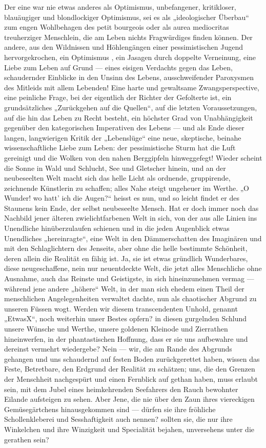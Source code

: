 Der eine war nie etwas anderes als Optimismus, unbefangener, kritikloser, blauäugiger und blondlockiger Optimismus, sei es als „ideologischer Überbau“ zum engen Wohlbehagen des petit bourgeois oder als aurea mediocritas treuherziger Menschlein, die am Leben nichts Fragwürdiges finden können. Der andere, aus den Wildnissen und Höhlengängen einer pessimistischen Jugend hervorgekrochen, ein Optimismus , ein Jasagen durch doppelte Verneinung, eine Liebe zum Leben auf Grund — eines eisigen Verdachts gegen das Leben, schaudernder Einblicke in den Unsinn des Lebens, ausschweifender Paroxysmen des Mitleids mit allem Lebenden! Eine harte und gewaltsame Zwangsperspective, eine peinliche Frage, bei der eigentlich der Richter der Gefolterte ist, ein grundsätzliches „Zurückgehen auf die Quellen“, auf die letzten Voraussetzungen, auf die hin das Leben zu Recht besteht, ein höchster Grad von Unabhängigkeit gegenüber den kategorischen Imperativen des Lebens — und als Ende dieser langen, langwierigen Kritik der „Lebenslüge“ eine neue, skeptische, beinahe wissenschaftliche Liebe zum Leben: der pessimistische Sturm hat die Luft gereinigt und die Wolken von den nahen Berggipfeln hinweggefegt! Wieder scheint die Sonne in Wald und Schlucht, See und Gletscher hinein, und an der neubeseelten Welt macht sich das helle Licht als ordnende, gruppirende, zeichnende Künstlerin zu schaffen; alles Nahe steigt ungeheuer im Werthe. „O Wunder! wo hatt’ ich die Augen?“ heisst es nun, und so leicht findet er des Staunens kein Ende, der selbst neubeseelte Mensch. Hat er doch immer noch das Nachbild jener älteren zwielichtfarbenen Welt in sich, von der aus alle Linien ins Unendliche hinüberzulaufen schienen und in die jeden Augenblick etwas Unendliches „hereinragte“, eine Welt in den Dämmerschatten des Imaginären und mit den Schlaglichtern des Jenseits, aber ohne die helle bestimmte Schönheit, deren allein die Realität en  fähig ist. Ja, sie ist etwas gründlich Wunderbares, diese neugeschaffene, nein nur neuentdeckte  Welt, die jetzt alles Menschliche ohne Ausnahme, auch das Reinste und Geistigste, in sich hineinzunehmen vermag — während jene andere „höhere“ Welt, in der man sich ehedem einen Theil der menschlichen Angelegenheiten verwaltet dachte, nun als chaotischer Abgrund zu unseren Füssen wogt. Werden wir diesem transcendenten Unhold, genannt „Etwas\Math{=}X“, noch weiterhin unser Bestes opfern? in diesen gurgelnden Schlund unsere Wünsche und Werthe, unsere goldenen Kleinode und Zierrathen hineinwerfen, in der phantastischen Hoffnung, dass er sie uns aufbewahre und dereinst vermehrt wiedergebe? Nein — wir, die am Rande des Abgrunds gehangen und uns schaudernd auf festen Boden zurückgerettet haben, wissen das Feste, Betretbare, den Erdgrund der Realität zu schätzen; uns, die den Grenzen der Menschheit nachgespürt und einen Fernblick auf  gethan haben, muss erlaubt sein, mit dem Jubel eines heimkehrenden Seefahrers den Rauch bewohnter Eilande aufsteigen zu sehen. Aber Jene, die nie über den Zaun ihres viereckigen Gemüsegärtchens hinausgekommen sind — dürfen sie ihre fröhliche Schollenkleberei und Sesshaftigkeit auch  nennen? sollten sie, die nur ihre Winkelchen und ihre Winzigkeit und Specialität bejahen, unversehens unter die  gerathen sein?
\par

